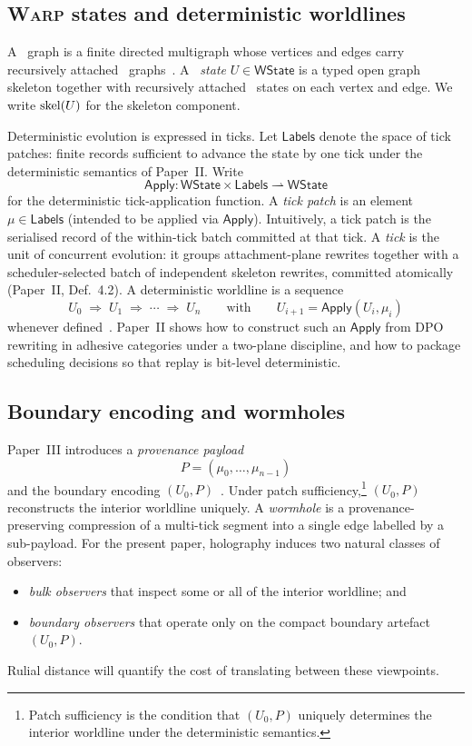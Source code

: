 \documentclass{aion}
\newcommand{\WState}{\mathsf{WState}}
\newcommand{\Labels}{\mathsf{Labels}}
\newcommand{\Apply}{\mathsf{Apply}}
\begin{document}
\subsection[Warp states and deterministic worldlines]{\textnormal{\textsc{Warp}} states and deterministic worldlines}
\label{subsec:prelim-warps}

A \WARP\ graph is a finite directed multigraph whose vertices and edges carry recursively attached \WARP\ graphs~\cite{Ros25a}.
A \emph{\WARP\ state} $U\in\WState$ is a typed open graph skeleton together with recursively attached \WARP\ states on each vertex and edge.
We write $\operatorname{skel}(U)$ for the skeleton component.

Deterministic evolution is expressed in ticks.
Let $\Labels$ denote the space of tick patches: finite records sufficient to advance the state by one tick under the deterministic semantics of Paper~II.
Write
\[
  \Apply : \WState \times \Labels \rightharpoonup \WState
\]
	for the deterministic tick-application function.
	A \emph{tick patch} is an element $\mu\in\Labels$ (intended to be applied via $\Apply$).
	Intuitively, a tick patch is the serialised record of the within-tick batch committed at that tick.
	A \emph{tick} is the unit of concurrent evolution: it groups attachment-plane rewrites together with a scheduler-selected batch of independent skeleton rewrites, committed atomically (Paper~II, Def.~4.2).
	A deterministic worldline is a sequence
\[
  U_0 \;\Rightarrow\; U_1 \;\Rightarrow\; \cdots \;\Rightarrow\; U_n
\qquad\text{with}\qquad
U_{i+1}=\Apply(U_i,\mu_i)
\]
whenever defined~\cite{Ros25b}.
Paper~II shows how to construct such an $\Apply$ from DPO rewriting in adhesive categories under a two-plane discipline,
and how to package scheduling decisions so that replay is bit-level deterministic.

\subsection{Boundary encoding and wormholes}
\label{subsec:prelim-holography}

Paper~III introduces a \emph{provenance payload}
\[
  P=(\mu_0,\ldots,\mu_{n-1})
\]
and the boundary encoding $(U_0,P)$~\cite{Ros25c}.
Under patch sufficiency,\footnote{Patch sufficiency is the condition that $(U_0,P)$ uniquely determines the interior worldline under the deterministic semantics.}
$(U_0,P)$ reconstructs the interior worldline uniquely.
A \emph{wormhole} is a provenance-preserving compression of a multi-tick segment into a single edge labelled by a sub-payload.
For the present paper, holography induces two natural classes of observers:
\begin{itemize}[leftmargin=*]
  \item \emph{bulk observers} that inspect some or all of the interior worldline; and
  \item \emph{boundary observers} that operate only on the compact boundary artefact $(U_0,P)$.
\end{itemize}
Rulial distance will quantify the cost of translating between these viewpoints.
\end{document}
